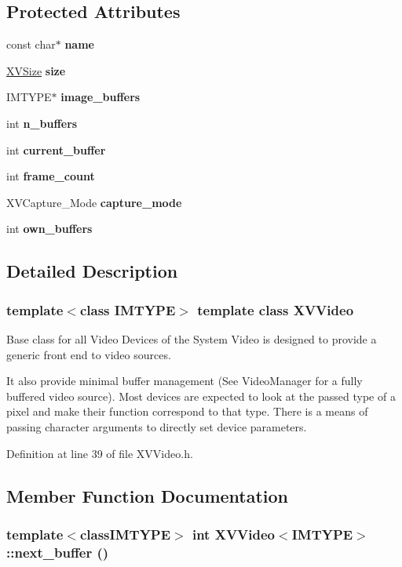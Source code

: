 \subsection*{Protected Attributes}
\begin{CompactItemize}
\item 
const char$\ast$ {\bf name}
\item 
\hyperlink{class_XVSize}{XVSize} {\bf size}
\item 
IMTYPE$\ast$ {\bf image\_\-buffers}
\item 
int {\bf n\_\-buffers}
\item 
int {\bf current\_\-buffer}
\item 
int {\bf frame\_\-count}
\item 
XVCapture\_\-Mode {\bf capture\_\-mode}
\item 
int {\bf own\_\-buffers}
\end{CompactItemize}


\subsection{Detailed Description}
\subsubsection*{template$<$class IMTYPE$>$  template class XVVideo}

Base class for all Video Devices of the System Video is designed to provide a generic front end to video sources.

It also provide minimal buffer management (See Video\-Manager for a fully buffered  video source). Most devices are expected to look at the passed type of a pixel and make their function correspond to that type. There is a means of passing character arguments to directly set device parameters. 



Definition at line 39 of file XVVideo.h.

\subsection{Member Function Documentation}
\label{XVVideo_b1}
\hypertarget{class_XVVideo_b1}{
\subsubsection[next_buffer]{\setlength{\rightskip}{0pt plus 5cm}template$<$classIMTYPE$>$ int XVVideo$<$IMTYPE$>$::next\_\-buffer ()}}




